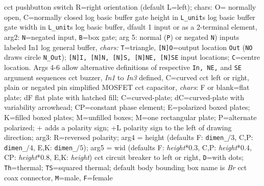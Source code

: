   {cct}
  {pushbutton switch R=right orientation (default L=left);
     chars: O= normally open, C=normally closed }
  {log}
  {basic buffer gate height in {\tt L\_unit}s}
  {log}
  {basic buffer gate width in {\tt L\_unit}s}
  {log}
  {basic buffer, dfault 1 input or as a 2-terminal element,
    arg2: {\tt N}=negated input, {\tt B}=box gate; arg 5:
    normal ({\tt P}) or negated {\tt N}) inputs labeled In1 
    }
  {log}
  {general buffer, {\sl chars:} {\tt T}=triangle,
            {\tt [N]O}=output location {\tt Out}
            ({\tt NO} draws circle {\tt N\_Out});
            {\tt [N]I, [N]N, [N]S, [N]NE, [N]SE}
            input locations; {\tt C}=centre location.
            Args 4-6 allow alternative
            definitions of respective {\tt In, NE,}
            and {\tt SE} argument sequences }
  {cct}
  {buzzer, {\sl In1} to {\sl In3} defined, C=curved
   }
%
  {cct}
  {left or right, plain or negated pin simplified MOSFET}
  {cct}
  {capacitor, {\sl chars}:
    F or blank=flat plate;
    dF flat plate with hatched fill;
    C=curved-plate;
    dC=curved-plate with variability arrowhead;
    CP=constant phase element;
    E=polarized boxed plates;
    K=filled boxed plates;
    M=unfilled boxes;
    M=one rectangular plate;
    P=alternate polarized;
    + adds a polarity sign;
    +L polarity sign to the left of drawing direction;
    arg3:  R=reversed polarity;
    arg4 = height (defaults F: {\tt dimen\_}$/3$,
      C,P: {\tt dimen\_}$/4$, E,K: {\tt dimen\_}$/5$);
    arg5 = wid (defaults F: {\sl height}*0.3,
      C,P: {\sl height}*0.4, CP: {\sl height}*0.8, E,K: {\sl height})
    }
  {cct}
  {circuit breaker to left or right, {\tt D}=with dots; {\tt Th}=thermal;
   {\tt TS}=squared thermal; default body bounding box name is
     {\sl Br}}
  {cct}
  {coax connector, {\tt M}=male, {\tt F}=female
    }
